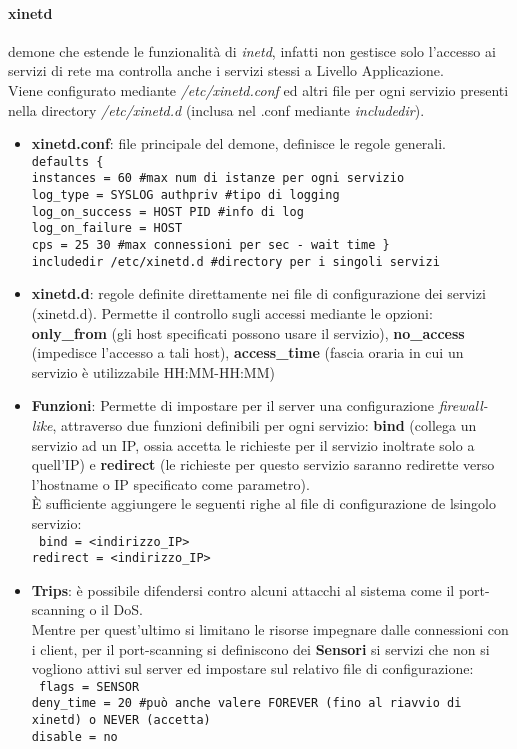 \documentclass[a4paper,11pt]{article}
\def\code#1{\texttt{#1}}
\begin{document}
\paragraph{xinetd} demone che estende le funzionalità di \textit{inetd}, infatti non gestisce solo l'accesso ai servizi di rete ma controlla anche i servizi stessi a Livello Applicazione.\\
Viene configurato mediante \textit{/etc/xinetd.conf} ed altri file per ogni servizio presenti nella directory \textit{/etc/xinetd.d} (inclusa nel .conf mediante \textit{includedir}). 
\begin{itemize}
\item \textbf{xinetd.conf}: file principale del demone, definisce le regole generali.
\code{
defaults \{ \\
instances = 60 \#max num di istanze per ogni servizio\\
log\_type = SYSLOG authpriv \#tipo di logging\\
log\_on\_success = HOST PID \#info di log\\
log\_on\_failure = HOST\\
cps = 25 30 \#max connessioni per sec - wait time \} \\
includedir /etc/xinetd.d \#directory per i singoli servizi
}
\item \textbf{xinetd.d}: regole definite direttamente nei file di configurazione dei servizi (xinetd.d). Permette il controllo sugli accessi mediante le opzioni: \textbf{only\_from} (gli host specificati possono usare il servizio), \textbf{no\_access} (impedisce l'accesso a tali host), \textbf{access\_time} (fascia oraria in cui un servizio è utilizzabile HH:MM-HH:MM)
\item \textbf{Funzioni}: Permette di impostare per il server una configurazione \textit{firewall-like}, attraverso due funzioni definibili per ogni servizio:  \textbf{bind} (collega un servizio ad un IP, ossia accetta le richieste per il servizio inoltrate solo a quell'IP) e \textbf{redirect} (le richieste per questo servizio saranno redirette verso l'hostname o IP specificato come parametro).\\È sufficiente aggiungere le seguenti righe al file di configurazione de lsingolo servizio:\\
\code{
bind = <indirizzo\_IP> \\
redirect = <indirizzo\_IP>
}
\item \textbf{Trips}: è possibile difendersi contro alcuni attacchi al sistema come il port-scanning o il DoS.\\
Mentre per quest'ultimo si limitano le risorse impegnare dalle connessioni con i client, per il port-scanning si definiscono dei \textbf{Sensori} si servizi che non si vogliono attivi sul server ed impostare sul relativo file di configurazione:\\
\code{
flags = SENSOR\\
deny\_time = 20 \#può anche valere FOREVER (fino al riavvio di xinetd) o NEVER (accetta)\\
disable = no
}
\end{itemize}
\end{document}
